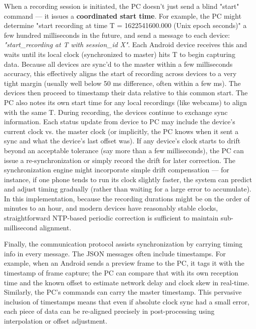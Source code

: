 \documentclass[11pt,a4paper]{report}
\begin{document}
When a recording session is initiated, the PC doesn't just send a blind
"start" command --- it issues a \textbf{coordinated start time}. For example,
the PC might determine "start recording at time T = 1622541600.000 (Unix
epoch seconds)" a few hundred milliseconds in the future, and send a
message to each device: \textit{"start\_recording at T with session\_id X"}. Each
Android device receives this and waits until its local clock
(synchronized to master) hits T to begin capturing
data.
Because all devices are sync'd to the master within a few milliseconds
accuracy, this effectively aligns the start of recording across devices
to a very tight margin (usually well below 50 ms difference, often
within a few ms). The devices then proceed to timestamp their data
relative to this common start. The PC also notes its own start time for
any local recordings (like webcams) to align with the same T. During
recording, the devices continue to exchange sync information. Each
status update from device to PC may include the device's current clock
vs. the master clock (or implicitly, the PC knows when it sent a sync
and what the device's last offset was). If any device's clock starts to
drift beyond an acceptable tolerance (say more than a few milliseconds),
the PC can issue a re-synchronization or simply record the drift for
later correction. The synchronization engine might incorporate simple
drift compensation --- for instance, if one phone tends to run its clock
slightly faster, the system can predict and adjust timing gradually
(rather than waiting for a large error to
accumulate).
In this implementation, because the recording durations might be on the
order of minutes to an hour, and modern devices have reasonably stable
clocks, straightforward NTP-based periodic correction is sufficient to
maintain sub-millisecond
alignment.

Finally, the communication protocol assists synchronization by carrying
timing info in every message. The JSON messages often include
timestamps. For example, when an Android sends a preview frame to the
PC, it tags it with the timestamp of frame capture; the PC can compare
that with its own reception time and the known offset to estimate
network delay and clock skew in
real-time.
Similarly, the PC's commands can carry the master timestamp. This
pervasive inclusion of timestamps means that even if absolute clock sync
had a small error, each piece of data can be re-aligned precisely in
post-processing using interpolation or offset adjustment.
\end{document}
